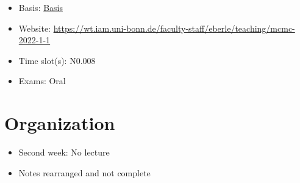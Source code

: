 \begin{tcolorbox}[enhanced,breakable,
	title=General Information,frame style={color=mycolor}]
    \begin{itemize}
        \item Basis: \href{https://basis.uni-bonn.de/qisserver/rds?state=verpublish&status=init&vmfile=no&publishid=253504&moduleCall=webInfo&publishConfFile=webInfo&publishSubDir=veranstaltung}{Basis}
        \item Website: \href{https://wt.iam.uni-bonn.de/faculty-staff/eberle/teaching/mcmc-2022-1-1}{https://wt.iam.uni-bonn.de/faculty-staff/eberle/teaching/mcmc-2022-1-1}
        \item Time slot(s):  N0.008
        \item Exams: Oral
    \end{itemize}
\end{tcolorbox}

\section{Organization}

\begin{itemize}
    \item Second week: No lecture
    \item Notes rearranged and not complete
\end{itemize}

